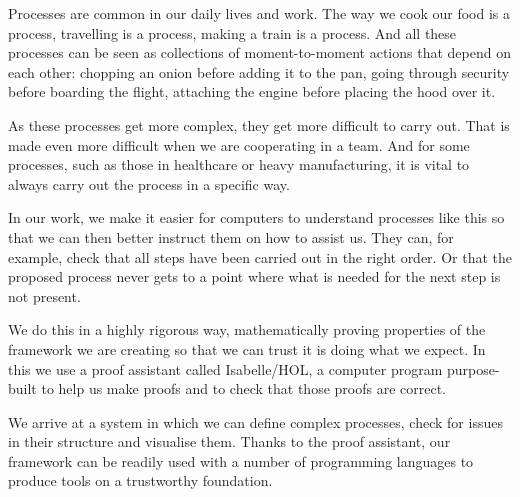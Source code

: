 Processes are common in our daily lives and work.
The way we cook our food is a process, travelling is a process, making a train is a process.
And all these processes can be seen as collections of moment-to-moment actions that depend on each other: chopping an onion before adding it to the pan, going through security before boarding the flight, attaching the engine before placing the hood over it.

As these processes get more complex, they get more difficult to carry out.
That is made even more difficult when we are cooperating in a team.
And for some processes, such as those in healthcare or heavy manufacturing, it is vital to always carry out the process in a specific way.

In our work, we make it easier for computers to understand processes like this so that we can then better instruct them on how to assist us.
They can, for example, check that all steps have been carried out in the right order.
Or that the proposed process never gets to a point where what is needed for the next step is not present.

We do this in a highly rigorous way, mathematically proving properties of the framework we are creating so that we can trust it is doing what we expect.
In this we use a proof assistant called Isabelle/HOL, a computer program purpose-built to help us make proofs and to check that those proofs are correct.

We arrive at a system in which we can define complex processes, check for issues in their structure and visualise them.
Thanks to the proof assistant, our framework can be readily used with a number of programming languages to produce tools on a trustworthy foundation.
